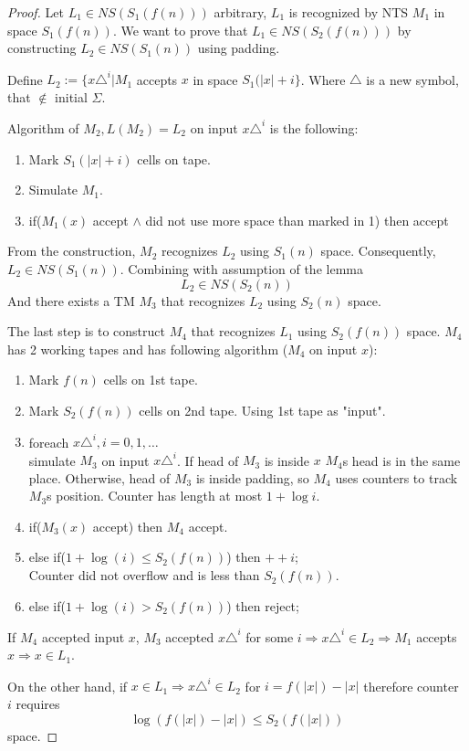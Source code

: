 \begin{proof}
	Let $L_1 \in NS(S_1(f(n)))$ arbitrary, $L_1$ is recognized by NTS $M_1$ in space $S_1(f(n))$.
	We want to prove that $L_1 \in NS(S_2(f(n)))$ by constructing $L_2 \in NS(S_1(n))$ using padding.

	Define $L_2 := \{ x\triangle^i | M_1 $ accepts $x$ in space $S_1(|x| + i \} $.
	Where $\triangle$ is a new symbol, that $\notin $ initial $\Sigma$.

	Algorithm of $M_2, L(M_2) = L_2$ on input $x\triangle^i$ is the following:
\begin{enumerate}
	\item Mark $S_1(|x| + i)$ cells on tape.
	\item Simulate $M_1$.
	\item if($M_1(x)$ accept $\land$ did not use more space than marked in 1) then accept
\end{enumerate}
	From the construction, $M_2$ recognizes $L_2$ using $S_1(n)$ space.
	Consequently, $L_2 \in NS(S_1(n))$.
	Combining with assumption of the lemma
	\[ L_2 \in NS(S_2(n)) \]
	And there exists a TM $M_3$ that recognizes $L_2$ using $S_2(n)$ space.

	The last step is to construct $M_4$ that recognizes $L_1$ using $S_2(f(n))$ space.
	$M_4$ has 2 working tapes and has following algorithm ($M_4$ on input $x$):
\begin{enumerate}
	\item Mark $f(n)$ cells on 1st tape.
	\item Mark $S_2(f(n))$ cells on 2nd tape. Using 1st tape as "input".
	\item foreach $x\triangle^i, i = 0, 1, \ldots $ \\
		simulate $M_3$ on input $x\triangle^i$.
		If head of $M_3$ is inside $x$ $M_4$s head is in the same place.
		Otherwise, head of $M_3$ is inside padding, so $M_4$ uses counters to track $M_3$s position.
		Counter has length at most $1 + \log i$.
	\item if($M_3(x)$ accept) then $M_4$ accept.
	\item else if($1 + \log(i) \leq S_2(f(n))$) then $++i$; \\
		Counter did not overflow and is less than $S_2(f(n))$.
	\item else if($1 + \log(i) > S_2(f(n))$) then reject;
\end{enumerate}

If $M_4$ accepted input $x$, $M_3$ accepted $x\triangle^i$ for some $i \Rightarrow x\triangle^i \in L_2 \Rightarrow M_1$ accepts $x \Rightarrow x \in L_1$.

On the other hand, if $x \in L_1 \Rightarrow x\triangle^i \in L_2$ for $i = f(|x|) - |x|$ therefore counter $i$ requires
\[ \log(f(|x|) - |x|) \leq S_2(f(|x|)) \]
space.

\end{proof}

